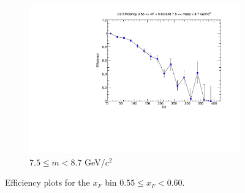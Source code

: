 \begin{figure}[p]
\begin{subfigure}[b]{0.32\textwidth}
        \includegraphics[width=\textwidth]{./kTrackerEfficiencyPlots/D2_Efficiency_xF11_mass10.pdf}
        \caption{$7.5 \leq m < 8.7$ GeV/$c^2$}
        \label{fig:xF11_mass10}
    \end{subfigure}
    \hfill
    \caption{Efficiency plots for the $x_F$ bin $0.55 \leq x_F < 0.60$.}
    \label{fig:xF11}
\end{figure}

\clearpage

